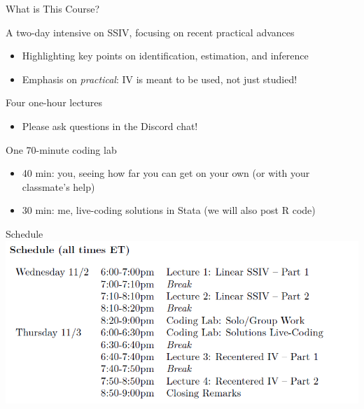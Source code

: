 \documentclass[t]{beamer}
\begin{document}
\begin{frame}{What is This Course?}

A two-day intensive on SSIV, focusing on recent practical advances

\begin{itemize}
  \item Highlighting key points on identification, estimation, and inference
  \item Emphasis on \emph{practical}: IV is meant to be used, not just studied!
\end{itemize}\pause\medskip

Four one-hour lectures

\begin{itemize}
  \item Please ask questions in the Discord chat!
\end{itemize}\pause\medskip

One 70-minute coding lab
\begin{itemize}
  \item 40 min: you, seeing how far you can get on your own (or with your classmate's help)
  \item 30 min: me, live-coding solutions in Stata (we will also post R code)
\end{itemize}

\end{frame}

\begin{frame}{Schedule}
\vspace*{\fill}
\includegraphics[scale=0.6]{./lecture_includes/schedule.png}
\vspace*{\fill}
\end{frame}
\end{document}
